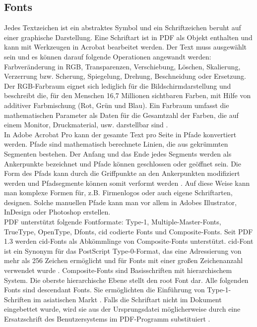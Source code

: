 \subsection{Fonts}
Jedes Textzeichen ist ein abstraktes Symbol und ein Schriftzeichen beruht auf einer graphische Darstellung. Eine Schriftart ist in PDF als Objekt enthalten und kann mit Werkzeugen in Acrobat bearbeitet werden. Der Text muss ausgewählt sein und es können darauf folgende Operationen angewandt werden: Farbveränderung in RGB, Transparenzen, Verschiebung, Löschen, Skalierung, Verzerrung bzw. Scherung, Spiegelung, Drehung, Beschneidung oder Ersetzung. Der RGB-Farbraum eignet sich lediglich für die Bildschirmdarstellung und beschreibt die, für den Menschen 16,7 Millionen sichtbaren Farben, mit Hilfe von additiver Farbmischung (Rot, Grün und Blau). Ein Farbraum umfasst die mathematischen Parameter als Daten für die Gesamtzahl der Farben, die auf einem Monitor, Druckmaterial, usw. darstellbar sind \cite{farbraum}. \\
In Adobe Acrobat Pro kann der gesamte Text pro Seite in Pfade konvertiert werden. Pfade sind mathematisch berechnete Linien, die aus gekrümmten Segmenten bestehen. Der Anfang und das Ende jedes Segments werden als Ankerpunkte bezeichnet und Pfade können geschlossen oder geöffnet sein. Die Form des Pfads kann durch die Griffpunkte an den Ankerpunkten modifiziert werden und Pfadsegmente können somit verformt werden \cite{adobe-pfade}. Auf diese Weise kann man komplexe Formen für, z.B. Firmenlogos oder auch eigene Schriftarten, designen. Solche manuellen Pfade kann man vor allem in Adobes Illustrator, InDesign oder Photoshop erstellen. \\ 
PDF unterstützt folgende Fontformate: Type-1, Multiple-Master-Fonts, TrueType, OpenType, Dfonts, \gls{cid} codierte Fonts und Composite-Fonts. Seit PDF 1.3 werden \gls{cid}-Fonts als Abkömmlinge von Composite-Fonts unterstützt. \gls{cid}-Font ist ein Synonym für das PostScript Type-0-Format, das eine Adressierung von mehr als 256 Zeichen ermöglicht und für Fonts mit einer großen Zeichenanzahl verwendet wurde \cite{typoinfo}. Composite-Fonts sind Basisschriften mit hierarchischem System. Die oberste hierarchische Ebene stellt den root Font dar. Alle folgenden Fonts sind descendant Fonts. Sie ermöglichten die Einführung von Type-1-Schriften im asiatischen Markt \cite{schneeberger}. Falls die Schriftart nicht im Dokument eingebettet wurde, wird sie aus der Ursprungsdatei möglicherweise durch eine Ersatzschrift des Benutzersystems im PDF-Programm substituiert \cite{schneeberger}. 

